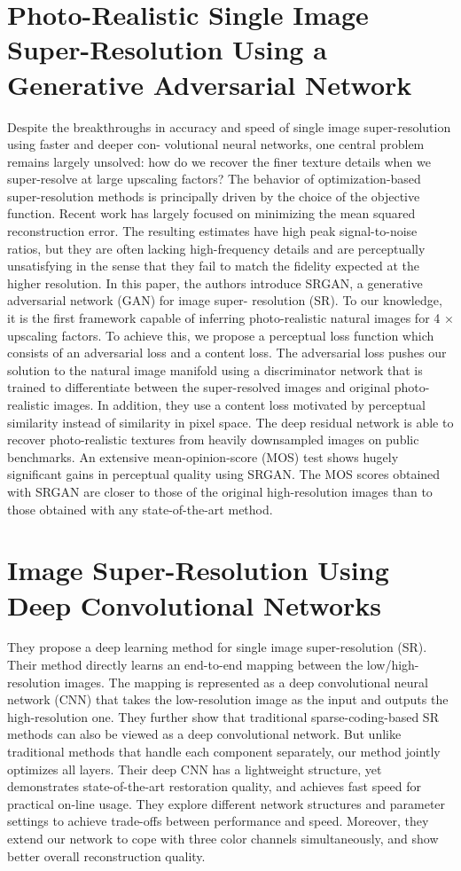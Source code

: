 \section{Photo-Realistic Single Image Super-Resolution Using a Generative Adversarial Network}
Despite the breakthroughs in accuracy and speed of single image super-resolution using faster and deeper con- volutional neural networks, one central problem remains largely unsolved: how do we recover the finer texture details when we super-resolve at large upscaling factors? The behavior of optimization-based super-resolution methods is principally driven by the choice of the objective function. Recent work has largely focused on minimizing the mean squared reconstruction error. The resulting estimates have high peak signal-to-noise ratios, but they are often lacking high-frequency details and are perceptually unsatisfying in the sense that they fail to match the fidelity expected at the higher resolution. In this paper, the authors introduce SRGAN, a generative adversarial network (GAN) for image super- resolution (SR). To our knowledge, it is the first framework capable of inferring photo-realistic natural images for 4 × upscaling factors. To achieve this, we propose a perceptual loss function which consists of an adversarial loss and a content loss. The adversarial loss pushes our solution to the natural image manifold using a discriminator network that is trained to differentiate between the super-resolved images and original photo-realistic images. In addition, they use a content loss motivated by perceptual similarity instead of similarity in pixel space. The deep residual network is able to recover photo-realistic textures from heavily downsampled images on public benchmarks. An extensive mean-opinion-score (MOS) test shows hugely significant gains in perceptual quality using SRGAN. The MOS scores obtained with SRGAN are closer to those of the original high-resolution images than to those obtained with any state-of-the-art method.

\section{Image Super-Resolution Using Deep Convolutional Networks}
They propose a deep learning method for single image super-resolution (SR). Their method directly learns an end-to-end mapping between the low/high-resolution images. The mapping is represented as a deep convolutional neural network (CNN) that takes the low-resolution image as the input and outputs the high-resolution one. They further show that traditional sparse-coding-based SR methods can also be viewed as a deep convolutional network. But unlike traditional methods that handle each component separately, our method jointly optimizes all layers. Their deep CNN has a lightweight structure, yet demonstrates state-of-the-art restoration quality, and achieves fast speed for practical on-line usage. They explore different network structures and parameter settings to achieve trade-offs between performance and speed. Moreover, they extend our network to cope with three color channels simultaneously, and show
better overall reconstruction quality.
